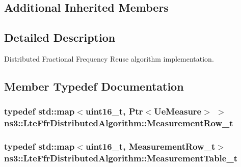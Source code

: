 \subsection*{Additional Inherited Members}


\subsection{Detailed Description}
Distributed Fractional Frequency Reuse algorithm implementation. 

\subsection{Member Typedef Documentation}
\subsubsection[{\texorpdfstring{Measurement\+Row\+\_\+t}{MeasurementRow_t}}]{\setlength{\rightskip}{0pt plus 5cm}typedef std\+::map$<$uint16\+\_\+t, {\bf Ptr}$<${\bf Ue\+Measure}$>$ $>$ {\bf ns3\+::\+Lte\+Ffr\+Distributed\+Algorithm\+::\+Measurement\+Row\+\_\+t}\hspace{0.3cm}{\ttfamily [private]}}\hypertarget{classns3_1_1LteFfrDistributedAlgorithm_a006ba77bb5533b9fc25640ed35f78d44}{}\label{classns3_1_1LteFfrDistributedAlgorithm_a006ba77bb5533b9fc25640ed35f78d44}
\subsubsection[{\texorpdfstring{Measurement\+Table\+\_\+t}{MeasurementTable_t}}]{\setlength{\rightskip}{0pt plus 5cm}typedef std\+::map$<$uint16\+\_\+t, {\bf Measurement\+Row\+\_\+t}$>$ {\bf ns3\+::\+Lte\+Ffr\+Distributed\+Algorithm\+::\+Measurement\+Table\+\_\+t}\hspace{0.3cm}{\ttfamily [private]}}\hypertarget{classns3_1_1LteFfrDistributedAlgorithm_ac46f79cc3cbb206c7cc80447f7f73a1b}{}\label{classns3_1_1LteFfrDistributedAlgorithm_ac46f79cc3cbb206c7cc80447f7f73a1b}


